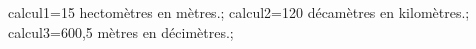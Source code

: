 \documentclass[exercice]{thedocument}%
\begin{document}
%
    \>calcul1=15 hectomètres en mètres.;%
    \>calcul2=120 décamètres en kilomètres.;%
    \>calcul3=600,5 mètres en décimètres.;%
\end{document}

